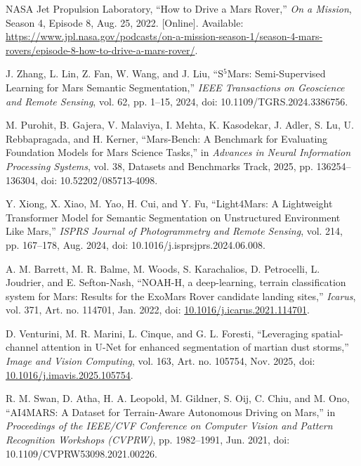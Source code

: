NASA Jet Propulsion Laboratory, ``How to Drive a Mars Rover,'' \emph{On a Mission}, Season 4, Episode 8, Aug. 25, 2022. [Online]. Available: \url{https://www.jpl.nasa.gov/podcasts/on-a-mission-season-1/season-4-mars-rovers/episode-8-how-to-drive-a-mars-rover/}.

J. Zhang, L. Lin, Z. Fan, W. Wang, and J. Liu, ``S\(^{5}\)Mars: Semi-Supervised Learning for Mars Semantic Segmentation,'' \emph{IEEE Transactions on Geoscience and Remote Sensing}, vol. 62, pp. 1--15, 2024, doi: 10.1109/TGRS.2024.3386756.

M. Purohit, B. Gajera, V. Malaviya, I. Mehta, K. Kasodekar, J. Adler, S. Lu, U. Rebbapragada, and H. Kerner, ``Mars-Bench: A Benchmark for Evaluating Foundation Models for Mars Science Tasks,'' in \emph{Advances in Neural Information Processing Systems}, vol. 38, Datasets and Benchmarks Track, 2025, pp. 136254--136304, doi: 10.52202/085713-4098.

Y. Xiong, X. Xiao, M. Yao, H. Cui, and Y. Fu, ``Light4Mars: A Lightweight Transformer Model for Semantic Segmentation on Unstructured Environment Like Mars,'' \emph{ISPRS Journal of Photogrammetry and Remote Sensing}, vol. 214, pp. 167--178, Aug. 2024, doi: 10.1016/j.isprsjprs.2024.06.008.

A. M. Barrett, M. R. Balme, M. Woods, S. Karachalios,
D. Petrocelli, L. Joudrier, and E. Sefton-Nash,
``NOAH-H, a deep-learning, terrain classification system for Mars:
Results for the ExoMars Rover candidate landing sites,''
\emph{Icarus}, vol. 371, Art. no. 114701, Jan. 2022,
doi: \href{https://doi.org/10.1016/j.icarus.2021.114701}
{10.1016/j.icarus.2021.114701}.

D. Venturini, M. R. Marini, L. Cinque, and G. L. Foresti,
``Leveraging spatial-channel attention in U-Net for enhanced
segmentation of martian dust storms,''
\emph{Image and Vision Computing}, vol. 163,
Art. no. 105754, Nov. 2025,
doi: \href{https://doi.org/10.1016/j.imavis.2025.105754}
{10.1016/j.imavis.2025.105754}.

R. M. Swan, D. Atha, H. A. Leopold, M. Gildner, S. Oij,
C. Chiu, and M. Ono,
``AI4MARS: A Dataset for Terrain-Aware Autonomous Driving on Mars,''
in \emph{Proceedings of the IEEE/CVF Conference on Computer Vision
    and Pattern Recognition Workshops (CVPRW)},
pp. 1982--1991, Jun. 2021,
doi: 10.1109/CVPRW53098.2021.00226.

